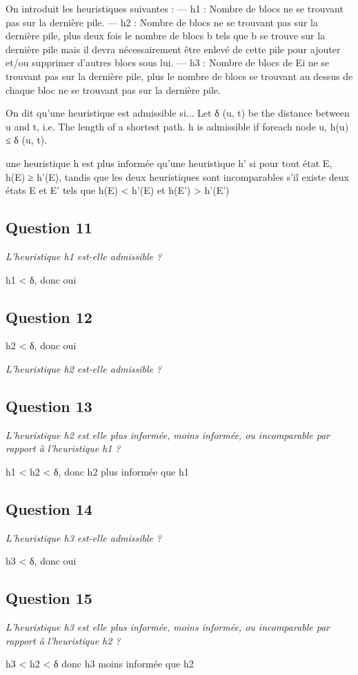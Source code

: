 On introduit les heuristiques suivantes :
— h1 : Nombre de blocs ne se trouvant pas sur la dernière pile.
— h2 : Nombre de blocs ne se trouvant pas sur la dernière pile, plus deux fois le nombre de blocs b tels que b se
trouve sur la dernière pile mais il devra nécessairement être enlevé de cette pile pour ajouter et/ou supprimer
d'autres blocs sous lui.
— h3 : Nombre de blocs de Ei ne se trouvant pas sur la dernière pile, plus le nombre de blocs se trouvant au
dessus de chaque bloc ne se trouvant pas sur la dernière pile.

On dit qu'une heuristique est admissible si...
Let δ (u, t) be the distance between u and t, i.e. The length of a shortest path. h is admissible if foreach node u, h(u) ≤ δ (u, t).

une heuristique h est plus informée qu'une heuristique h' si pour tout état E, h(E) ≥ h'(E), tandis que les deux heuristiques sont
incomparables s'il existe deux états E et E' tels que h(E) < h'(E) et h(E') > h'(E')

\subsection{Question 11}

\textit{L'heuristique h1 est-elle admissible ?}

h1 < δ, donc oui

\subsection{Question 12}

h2 < δ, donc oui

\textit{L'heuristique h2 est-elle admissible ?}

\subsection{Question 13}

\textit{L'heuristique h2 est elle plus informée, moins informée, ou incomparable par rapport à l'heuristique h1 ?}

h1 < h2 < δ, donc h2 plus informée que h1

\subsection{Question 14}

\textit{L'heuristique h3 est-elle admissible ?}

h3 < δ, donc oui

\subsection{Question 15}

\textit{L'heuristique h3 est elle plus informée, moins informée, ou incomparable par rapport à l'heuristique h2 ?}

h3 < h2 < δ donc h3 moins informée que h2


